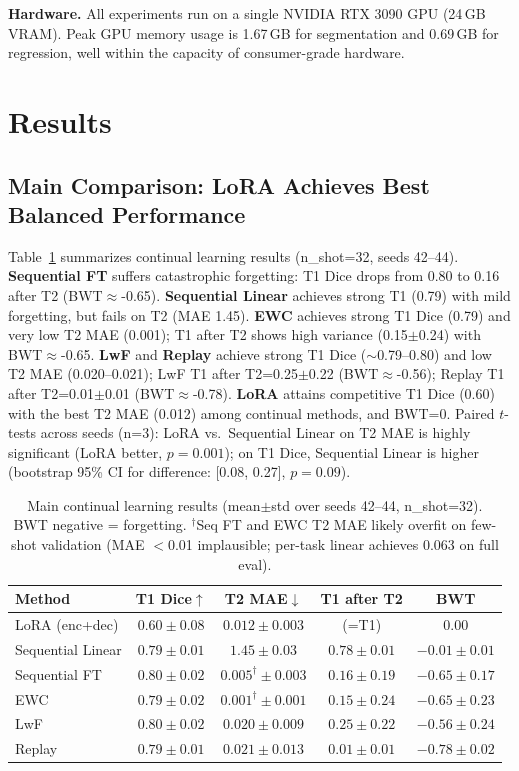 \documentclass[journal,twoside,web]{ieeecolor}
\begin{document}
\textbf{Hardware.} All experiments run on a single NVIDIA RTX 3090 GPU (24\,GB VRAM). Peak GPU memory usage is 1.67\,GB for segmentation and 0.69\,GB for regression, well within the capacity of consumer-grade hardware.


\section{Results}
\label{sec:results}

\subsection{Main Comparison: LoRA Achieves Best Balanced Performance}
\label{sec:main}

Table~\ref{tab:main} summarizes continual learning results (n\_shot=32, seeds 42--44). \textbf{Sequential FT} suffers catastrophic forgetting: T1 Dice drops from 0.80 to 0.16 after T2 (BWT$\approx$-0.65). \textbf{Sequential Linear} achieves strong T1 (0.79) with mild forgetting, but fails on T2 (MAE 1.45). \textbf{EWC} achieves strong T1 Dice (0.79) and very low T2 MAE (0.001); T1 after T2 shows high variance (0.15$\pm$0.24) with BWT$\approx$-0.65. \textbf{LwF} and \textbf{Replay} achieve strong T1 Dice ($\sim$0.79--0.80) and low T2 MAE (0.020--0.021); LwF T1 after T2=0.25$\pm$0.22 (BWT$\approx$-0.56); Replay T1 after T2=0.01$\pm$0.01 (BWT$\approx$-0.78). \textbf{LoRA} attains competitive T1 Dice (0.60) with the best T2 MAE (0.012) among continual methods, and BWT=0. Paired $t$-tests across seeds (n=3): LoRA vs.\ Sequential Linear on T2 MAE is highly significant (LoRA better, $p=0.001$); on T1 Dice, Sequential Linear is higher (bootstrap 95\% CI for difference: [0.08, 0.27], $p=0.09$).

\begin{table}[t]
\caption{Main continual learning results (mean$\pm$std over seeds 42--44, n\_shot=32). BWT negative = forgetting. $^\dagger$Seq FT and EWC T2 MAE likely overfit on few-shot validation (MAE $<$0.01 implausible; per-task linear achieves 0.063 on full eval).}
\label{tab:main}
\centering
\begin{tabular}{lcccc}
\toprule
Method & T1 Dice$\uparrow$ & T2 MAE$\downarrow$ & T1 after T2 & BWT \\
\midrule
LoRA (enc+dec) & $0.60 \pm 0.08$ & $0.012 \pm 0.003$ & (=T1) & $\mathbf{0.00}$ \\
Sequential Linear & $0.79 \pm 0.01$ & $1.45 \pm 0.03$ & $0.78 \pm 0.01$ & $-0.01 \pm 0.01$ \\
Sequential FT & $0.80 \pm 0.02$ & $0.005^\dagger \pm 0.003$ & $0.16 \pm 0.19$ & $-0.65 \pm 0.17$ \\
EWC & $0.79 \pm 0.02$ & $0.001^\dagger \pm 0.001$ & $0.15 \pm 0.24$ & $-0.65 \pm 0.23$ \\
LwF & $0.80 \pm 0.02$ & $0.020 \pm 0.009$ & $0.25 \pm 0.22$ & $-0.56 \pm 0.24$ \\
Replay & $0.79 \pm 0.01$ & $0.021 \pm 0.013$ & $0.01 \pm 0.01$ & $-0.78 \pm 0.02$ \\
\bottomrule
\end{tabular}
\end{table}
\end{document}

